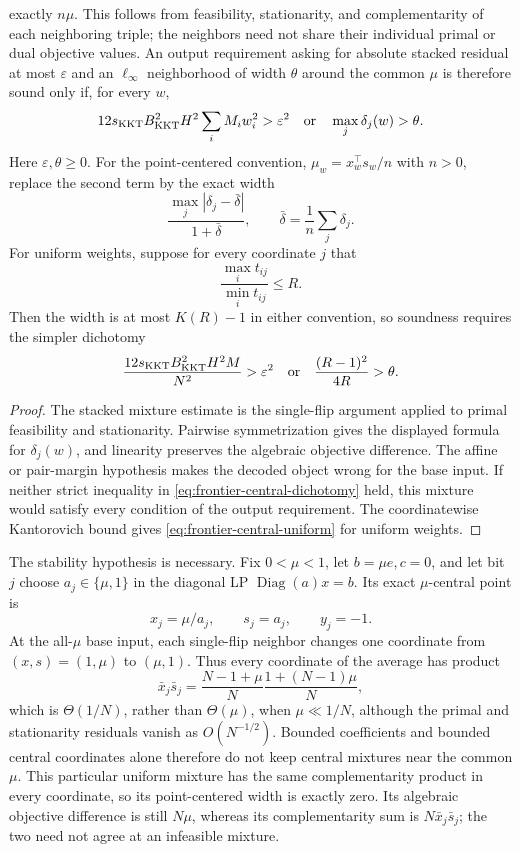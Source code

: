 \begin{proposition}
exactly \(n\mu\).  This follows from feasibility, stationarity, and
complementarity of each neighboring triple; the neighbors need not share
their individual primal or dual objective values.  An output requirement asking for
absolute stacked residual at most \(\varepsilon\) and an \(\ell_\infty\)
neighborhood of width \(\theta\) around the common \(\mu\) is therefore
sound only if, for every \(w\),
\begin{equation}
 12s_{\rm KKT}B_{\rm KKT}^2H^2\sum_iM_iw_i^2>\varepsilon^2
 \quad\text{or}\quad
 \max_j\delta_j(w)>\theta.
 \label{eq:frontier-central-dichotomy}
\end{equation}
Here \(\varepsilon,\theta\geq0\).  For the point-centered convention,
\(\mu_w=x_w^\top s_w/n\) with \(n>0\), replace the second term by the exact
width
\[
 \frac{\max_j|\delta_j-\bar\delta|}{1+\bar\delta},
 \qquad \bar\delta=\frac1n\sum_j\delta_j.
\]
For uniform weights, suppose for every coordinate \(j\) that
\[
 \frac{\max_i t_{ij}}{\min_i t_{ij}}\leq R.
\]
Then the width is at most \(K(R)-1\) in either convention, so soundness
requires the simpler dichotomy
\begin{equation}
 \frac{12s_{\rm KKT}B_{\rm KKT}^2H^2M}{N^2}>\varepsilon^2
 \quad\text{or}\quad
 \frac{(R-1)^2}{4R}>\theta.
 \label{eq:frontier-central-uniform}
\end{equation}
\end{proposition}

\begin{proof}
The stacked mixture estimate is the single-flip argument applied to primal
feasibility and stationarity.  Pairwise symmetrization gives the displayed
formula for \(\delta_j(w)\), and linearity preserves the algebraic objective
difference.  The affine or pair-margin hypothesis makes the decoded object wrong for the
base input.  If neither strict inequality in
\eqref{eq:frontier-central-dichotomy} held, this mixture would satisfy
every condition of the output requirement.  The coordinatewise Kantorovich
bound gives \eqref{eq:frontier-central-uniform} for uniform weights.
\end{proof}

The stability hypothesis is necessary.  Fix \(0<\mu<1\), let
\(b=\mu e,c=0\), and let bit \(j\) choose
\(a_j\in\{\mu,1\}\) in the diagonal LP
\(\operatorname{Diag}(a)x=b\).  Its exact \(\mu\)-central point is
\[
 x_j=\mu/a_j,\qquad s_j=a_j,\qquad y_j=-1.
\]
At the all-\(\mu\) base input, each single-flip neighbor changes one
coordinate from \((x,s)=(1,\mu)\) to \((\mu,1)\).  Thus every coordinate of
the average has product
\[
 \bar x_j\bar s_j
 =\frac{N-1+\mu}{N}\frac{1+(N-1)\mu}{N},
\]
which is \(\Theta(1/N)\), rather than \(\Theta(\mu)\), when
\(\mu\ll1/N\), although the primal and stationarity residuals vanish as
\(O(N^{-1/2})\).  Bounded coefficients and bounded central coordinates alone
therefore do not keep central mixtures near the common \(\mu\).  This
particular uniform mixture has the same complementarity
product in every coordinate, so its point-centered width is exactly zero.
Its algebraic objective difference is still \(N\mu\), whereas its
complementarity sum is \(N\bar x_j\bar s_j\); the two need not agree at
an infeasible mixture.

